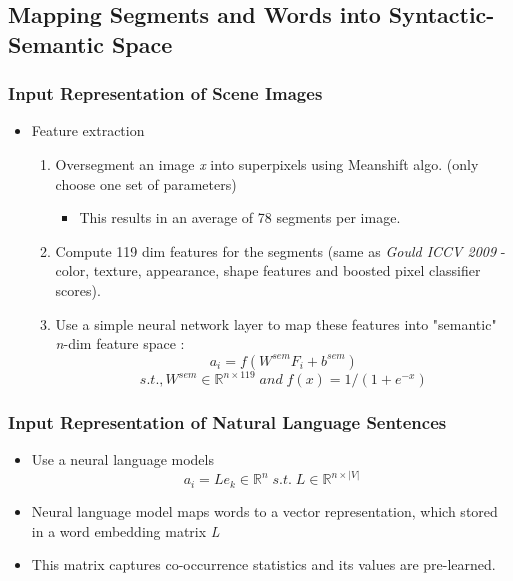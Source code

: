 \documentclass{beamer}
\begin{document}
\subsection{Mapping Segments and Words into Syntactic-Semantic Space}
\frame
{
	\frametitle{Input Representation of Scene Images}
	\begin{itemize}
		\item Feature extraction
			\begin{enumerate}
				\item Oversegment an image \textit{x} into superpixels using Meanshift algo. (only choose one set of parameters)
					\begin{itemize}
					\item This results in an average of 78 segments per image. 
					\end{itemize}
				\item Compute 119 dim features for the segments (same as \textit{Gould ICCV 2009} - color, texture, appearance, shape  features and boosted pixel classifier scores).
				\item Use a simple neural network layer to map these features into "semantic" \textit{n}-dim feature space :
				$$ a_i = f(W^{\textit{sem}}F_i+b^{sem}) $$ 
				$$ s.t., W^{sem} \in \mathbb{R}^{n\times119} \;and\; f(x)=1/(1+e^{-x})$$
			\end{enumerate}
	\end{itemize}
}
\frame
{
	\frametitle{Input Representation of Natural Language Sentences}
	\begin{itemize}
		\item Use a neural language models
		$$ a_i = Le_k \in \mathbb{R}^n \; s.t. \; L \in \mathbb{R}^{n\times|V|} $$
		\item Neural language model maps words to a vector representation, which stored in a word embedding matrix \textit{L}
		\item This matrix captures co-occurrence statistics and its values are pre-learned. 
	\end{itemize}
}
\end{document}
